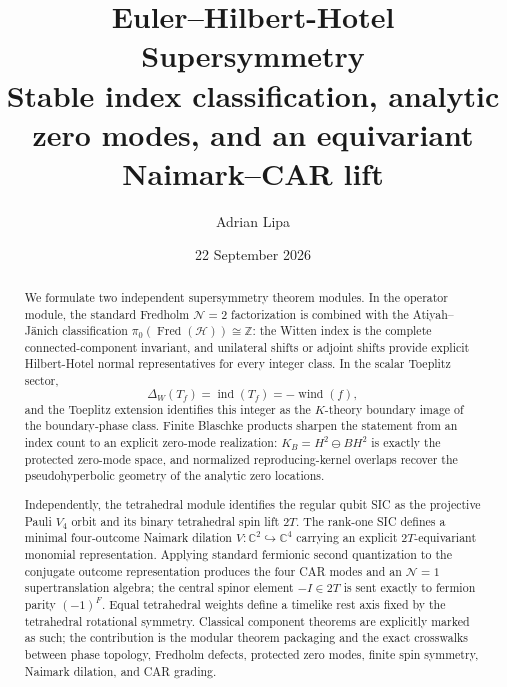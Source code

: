 \documentclass[11pt,a4paper]{article}
\title{\textbf{Euler--Hilbert-Hotel Supersymmetry}\\\large Stable index classification, analytic zero modes, and an equivariant Naimark--CAR lift}
\author{Adrian Lipa}
\date{22 September 2026}
\begin{document}
\maketitle
\begin{abstract}
We formulate two independent supersymmetry theorem modules. In the operator module, the standard Fredholm $\mathcal N=2$ factorization is combined with the Atiyah--J\"anich classification $\pi_0(\operatorname{Fred}(\mathcal H))\cong\mathbb Z$: the Witten index is the complete connected-component invariant, and unilateral shifts or adjoint shifts provide explicit Hilbert-Hotel normal representatives for every integer class. In the scalar Toeplitz sector,
\[
\Delta_W(T_f)=\operatorname{ind}(T_f)=-\operatorname{wind}(f),
\]
and the Toeplitz extension identifies this integer as the $K$-theory boundary image of the boundary-phase class. Finite Blaschke products sharpen the statement from an index count to an explicit zero-mode realization: $K_B=H^2\ominus BH^2$ is exactly the protected zero-mode space, and normalized reproducing-kernel overlaps recover the pseudohyperbolic geometry of the analytic zero locations.

Independently, the tetrahedral module identifies the regular qubit SIC as the projective Pauli $V_4$ orbit and its binary tetrahedral spin lift $2T$. The rank-one SIC defines a minimal four-outcome Naimark dilation $V:\mathbb C^2\hookrightarrow\mathbb C^4$ carrying an explicit $2T$-equivariant monomial representation. Applying standard fermionic second quantization to the conjugate outcome representation produces the four CAR modes and an $\mathcal N=1$ supertranslation algebra; the central spinor element $-I\in2T$ is sent exactly to fermion parity $(-1)^F$. Equal tetrahedral weights define a timelike rest axis fixed by the tetrahedral rotational symmetry. Classical component theorems are explicitly marked as such; the contribution is the modular theorem packaging and the exact crosswalks between phase topology, Fredholm defects, protected zero modes, finite spin symmetry, Naimark dilation, and CAR grading.
\end{abstract}




\end{document}
